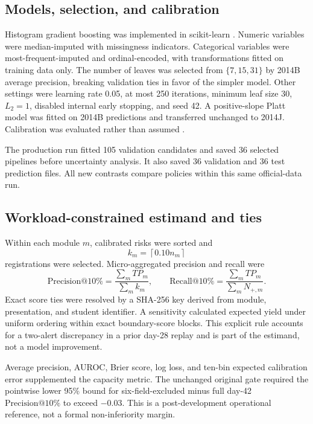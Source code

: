 \documentclass[11pt]{article}
\makeatletter
\newcommand{\Pten}{\ensuremath{\mathrm{Precision}@10\%}}
\newcommand{\Rten}{\ensuremath{\mathrm{Recall}@10\%}}
\makeatother
\begin{document}
\subsection{Models, selection, and calibration}

Histogram gradient boosting was implemented in scikit-learn \citep{pedregosa2011scikit}. Numeric variables were median-imputed with missingness indicators. Categorical variables were most-frequent-imputed and ordinal-encoded, with transformations fitted on training data only. The number of leaves was selected from $\{7,15,31\}$ by 2014B average precision, breaking validation ties in favor of the simpler model. Other settings were learning rate 0.05, at most 250 iterations, minimum leaf size 30, $L_2=1$, disabled internal early stopping, and seed 42. A positive-slope Platt model was fitted on 2014B predictions and transferred unchanged to 2014J. Calibration was evaluated rather than assumed \citep{vancalster2019calibration,collins2024tripod,moons2025probast}.

The production run fitted 105 validation candidates and saved 36 selected pipelines before uncertainty analysis. It also saved 36 validation and 36 test prediction files. All new contrasts compare policies within this same official-data run.

\subsection{Workload-constrained estimand and ties}

Within each module $m$, calibrated risks were sorted and
\[
  k_m=\left\lceil 0.10 n_m\right\rceil
\]
registrations were selected. Micro-aggregated precision and recall were
\[
  \Pten=\frac{\sum_m TP_m}{\sum_m k_m}, \qquad
  \Rten=\frac{\sum_m TP_m}{\sum_m N_{+,m}}.
\]
Exact score ties were resolved by a SHA-256 key derived from module, presentation, and student identifier. A sensitivity calculated expected yield under uniform ordering within exact boundary-score blocks. This explicit rule accounts for a two-alert discrepancy in a prior day-28 replay and is part of the estimand, not a model improvement.

Average precision, AUROC, Brier score, log loss, and ten-bin expected calibration error supplemented the capacity metric. The unchanged original gate required the pointwise lower 95\% bound for six-field-excluded minus full day-42 \Pten{} to exceed $-0.03$. This is a post-development operational reference, not a formal non-inferiority margin.
\end{document}
